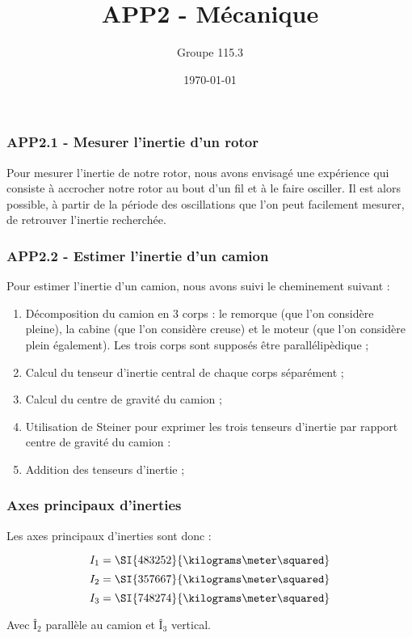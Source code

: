 \documentclass[pdf]{beamer}
\title{APP2 - Mécanique}
\author{Groupe 115.3}
\date{\today}
\begin{document}
\begin{frame}
	\titlepage
\end{frame}
\begin{frame}
	\frametitle{APP2.1 - Mesurer l'inertie d'un rotor}
	
	Pour mesurer l'inertie de notre rotor, nous avons envisagé une expérience
	qui consiste à accrocher notre rotor au bout d'un fil et à le faire osciller.
	Il est alors possible, à partir de la période des oscillations que l'on peut
	facilement mesurer, de retrouver l'inertie recherchée.
	
\end{frame}
\begin{frame}
	\frametitle{APP2.2 - Estimer l'inertie d'un camion}	

	Pour estimer l'inertie d'un camion, nous avons suivi le cheminement suivant :
	
	\begin{enumerate}
		\item Décomposition du camion en 3 corps : le remorque (que l'on considère
		pleine), la cabine (que l'on considère creuse) et le moteur (que l'on considère
		plein également). Les trois corps sont supposés être parallélipèdique ;
		\item Calcul du tenseur d'inertie central de chaque corps séparément ;
		\item Calcul du centre de gravité du camion ;
		\item Utilisation de Steiner pour exprimer les trois tenseurs d'inertie
		par rapport centre de gravité du camion :
		\item Addition des tenseurs d'inertie ;
	\end{enumerate}
\end{frame}
\begin{frame}
	\frametitle{Axes principaux d'inerties}
	
	Les axes principaux d'inerties sont donc :
	
	$$I_1 = \SI{483252}{\kilograms\meter\squared}$$
	$$I_2 = \SI{357667}{\kilograms\meter\squared}$$
	$$I_3 = \SI{748274}{\kilograms\meter\squared}$$
	
	Avec $Î_2$ parallèle au camion et $Î_3$ vertical.
\end{frame}
\end{document}
